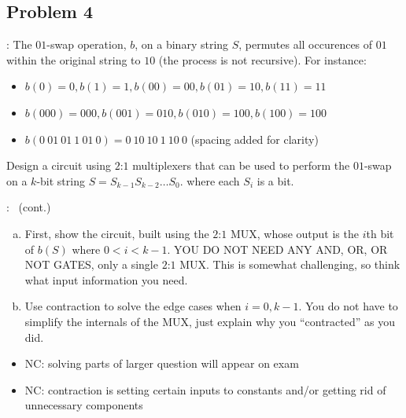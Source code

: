 \documentclass{../slides}
\begin{document}
\subsection{Problem 4}
\begin{frame}{\secname: \subsecname}
    The $01$-swap operation, $b$, on a binary string $S$, permutes all occurences of $01$ within the original string to $10$ (the process is not recursive). For instance:
    \begin{itemize}
        \item $b(0) = 0, b(1) = 1, b(00) = 00, b(01) = 10, b(11) = 11$
        \item $b(000) = 000, b(001) = 010, b(010) = 100, b(100) = 100$
        \item $b(0\ 01\ 01\ 1\ 01\ 0) = 0\ 10\ 10\ 1\ 10\ 0$ (spacing added for clarity)
    \end{itemize}
    Design a circuit using $2$:$1$ multiplexers that can be used to perform the $01$-swap on a $k$-bit string $S = S_{k-1}S_{k-2}\dots S_0$. where each $S_i$ is a bit.
\end{frame}

\begin{frame}{\secname: \subsecname\ (cont.)}
    \begin{enumerate}[(a)]
        \item First, show the circuit, built using the $2$:$1$ MUX, whose output is the $i$th bit of $b(S)$ where $0 < i < k - 1$. YOU DO NOT NEED ANY AND, OR, OR NOT GATES, only a single $2$:$1$ MUX. This is somewhat challenging, so think what input information you need.
        \item Use contraction to solve the edge cases when $i = 0, k - 1$. You do not have to simplify the internals of the MUX, just explain why you \enquote{contracted} as you did.
    \end{enumerate}
    \begin{itemize}
        \item NC: solving parts of larger question will appear on exam
        \item NC: contraction is setting certain inputs to constants and/or getting rid of unnecessary components
    \end{itemize}
\end{frame}
\end{document}
